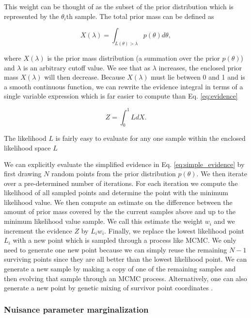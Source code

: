 This weight can be thought of as the subset of the prior distribution which is represented by the $\theta_i$th sample. The total prior mass can be defined as

\begin{equation}
    X(\lambda) = \int_{L(\theta) > \lambda} p(\theta) d\theta,
\end{equation}

where $X(\lambda)$ is the prior mass distribution (a summation over the prior $p(\theta)$) and $\lambda$ is an arbitrary cutoff value. We see that as $\lambda$ increases, the enclosed prior mass $X(\lambda)$ will then decrease. Because $X(\lambda)$ must lie between 0 and 1 and is a smooth continuous function, we can rewrite the evidence integral in terms of a single variable expression which is far easier to compute than Eq. \ref{eq:evidence}

\begin{equation}
    Z = \int_{0}^{1} L dX. \label{eq:simple_evidence}
\end{equation}

The likelihood $L$ is fairly easy to evaluate for any one sample within the enclosed likelihood space $L$ 

We can explicitly evaluate the simplified evidence in Eq. \ref{eq:simple_evidence} by first drawing $N$ random points from the prior distribution $p(\theta)$. We then iterate over a pre-determined number of iterations. For each iteration we compute the likelihood of all sampled points and determine the point with the minimum likelihood value. We then compute an estimate on the difference between the amount of prior mass covered by the the current samples above and up to the minimum likelihood value sample. We call this estimate the weight $w_i$ and we increment the evidence $Z$ by $L_i w_i$. Finally, we replace the lowest likelihood point $L_i$ with a new point which is sampled through a process like \ac{MCMC}. We only need to generate one new point because we can simply reuse the remaining $N-1$ surviving points since they are all better than the lowest likelihood point. We can generate a new sample by making a copy of one of the remaining samples and then evolving that sample through an \ac{MCMC} process. Alternatively, one can also generate a new point by genetic mixing of survivor point coordinates \cite{skilling2006}.

%
%

\subsubsection{Nuisance parameter marginalization}